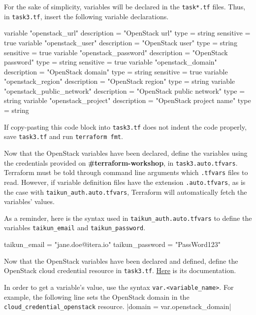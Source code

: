 For the sake of simplicity, variables will be declared in the \texttt{task*.tf} files.
Thus, in \texttt{task3.tf}, insert the following variable declarations.
\begin{tf}
variable "openstack_url" {
  description = "OpenStack url"
  type        = string
  sensitive   = true
}
variable "openstack_user" {
  description = "OpenStack user"
  type        = string
  sensitive   = true
}
variable "openstack_password" {
  description = "OpenStack password"
  type        = string
  sensitive   = true
}
variable "openstack_domain" {
  description = "OpenStack domain"
  type        = string
  sensitive   = true
}
variable "openstack_region" {
  description = "OpenStack region"
  type        = string
}
variable "openstack_public_network" {
  description = "OpenStack public network"
  type        = string
}
variable "openstack_project" {
  description = "OpenStack project name"
  type        = string
}
\end{tf}
\begin{note}
  If copy-pasting this code block into \texttt{task3.tf} does not indent the code properly,
  save \texttt{task3.tf} and run \texttt{terraform fmt}.
\end{note}

Now that the OpenStack variables have been declared,
define the variables using the credentials provided on \textbf{\#terraform-workshop}, in \texttt{task3.auto.tfvars}.\\

Terraform must be told through command line arguments which \texttt{.tfvars} files to read.
However, if variable definition files have the extension \texttt{.auto.tfvars}, as is the case with
\texttt{taikun\_auth.auto.tfvars}, Terraform will automatically fetch the variables' values.
\begin{tip}
As a reminder, here is the syntax used in \texttt{taikun\_auth.auto.tfvars} to define the variables \texttt{taikun\_email}
and \texttt{taikun\_password}.
\begin{tf}
taikun_email = "jane.doe@itera.io"
taikun_password = "PassWord123"
\end{tf}
\end{tip}

Now that the OpenStack variables have been declared and defined, define the OpenStack cloud credential resource in \texttt{task3.tf}.
\href{https://intuinewin.github.io/taikun-docs/resources/cloud_credential_openstack.html}{Here} is its documentation.

\begin{tip}
In order to get a variable's value, use the syntax \texttt{var.<variable\_name>}.
For example, the following line sets the OpenStack domain in the \texttt{cloud\_credential\_openstack} resource.
|domain = var.openstack_domain|
\end{tip}

